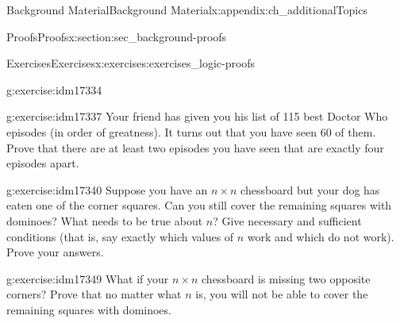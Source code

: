 \documentclass[oneside,10pt,]{book}
\numberwithin{equation}{chapter}
\begin{document}
\begin{appendixptx}{Background Material}{}{Background Material}{}{}{x:appendix:ch_additionalTopics}
\begin{sectionptx}{Proofs}{}{Proofs}{}{}{x:section:sec_background-proofs}
\begin{exercises-subsection}{Exercises}{}{Exercises}{}{}{x:exercises:exercises_logic-proofs}
\begin{divisionexercise}{17}{}{}{g:exercise:idm17334}
\end{divisionexercise}%
\begin{divisionexercise}{18}{}{}{g:exercise:idm17337}%
Your friend has given you his list of 115 best Doctor Who episodes (in order of greatness).  It turns out that you have seen 60 of them.  Prove that there are at least two episodes you have seen that are exactly four episodes apart.%
\end{divisionexercise}%
\begin{divisionexercise}{19}{}{}{g:exercise:idm17340}%
Suppose you have an \(n\times n\) chessboard but your dog has eaten one of the corner squares. Can you still cover the remaining squares with dominoes? What needs to be true about \(n\)? Give necessary and sufficient conditions (that is, say exactly which values of \(n\) work and which do not work). Prove your answers.%
\begin{sidebyside}{1}{0.4}{0.4}{0}%
\begin{sbspanel}{0.2}%
%
\end{sbspanel}%
\end{sidebyside}%
\end{divisionexercise}%
\begin{divisionexercise}{20}{}{}{g:exercise:idm17349}%
What if your \(n\times n\) chessboard is missing two opposite corners? Prove that no matter what \(n\) is, you will not be able to cover the remaining squares with dominoes.%
\begin{sidebyside}{1}{0.4}{0.4}{0}%
\begin{sbspanel}{0.2}%
%
\end{sbspanel}%

\end{sidebyside}
\end{divisionexercise}
\end{exercises-subsection}
\end{sectionptx}
\end{appendixptx}
\end{document}

